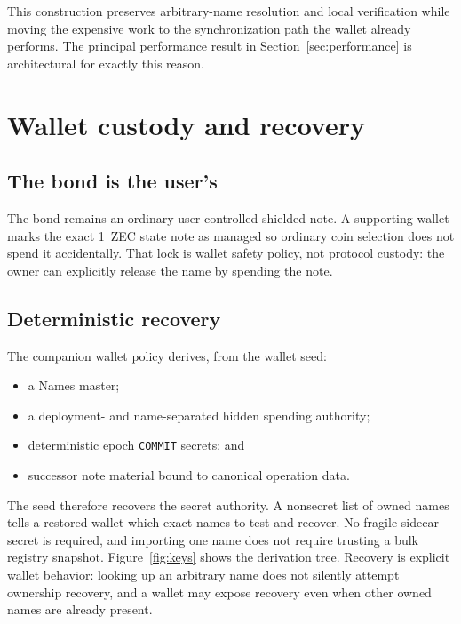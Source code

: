 \documentclass[11pt]{article}
\newcommand{\operation}[1]{\texttt{#1}}
\begin{document}
This construction preserves arbitrary-name resolution and local verification
while moving the expensive work to the synchronization path the wallet
already performs. The principal performance result in
Section~\ref{sec:performance} is architectural for exactly this reason.

\section{Wallet custody and recovery}
\label{sec:wallet}

\subsection{The bond is the user's}

The bond remains an ordinary user-controlled shielded note. A supporting
wallet marks the exact 1~ZEC state note as managed so ordinary coin selection
does not spend it accidentally. That lock is wallet safety policy, not
protocol custody: the owner can explicitly release the name by spending the
note.

\subsection{Deterministic recovery}

The companion wallet policy derives, from the wallet seed:

\begin{itemize}
\item a Names master;
\item a deployment- and name-separated hidden spending authority;
\item deterministic epoch \operation{COMMIT} secrets; and
\item successor note material bound to canonical operation data.
\end{itemize}

The seed therefore recovers the secret authority. A nonsecret list of owned
names tells a restored wallet which exact names to test and recover. No
fragile sidecar secret is required, and importing one name does not require
trusting a bulk registry snapshot. Figure~\ref{fig:keys} shows the
derivation tree. Recovery is explicit wallet behavior: looking up an
arbitrary name does not silently attempt ownership recovery, and a wallet may
expose recovery even when other owned names are already present.
\end{document}

